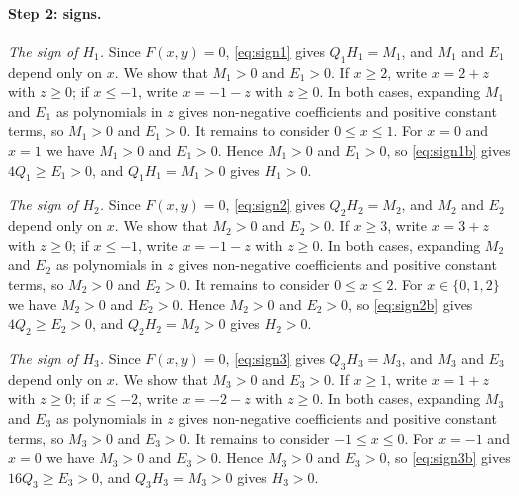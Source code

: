\documentclass[11pt]{article}
\begin{document}
\paragraph{Step 2: signs.} \emph{The sign of $H_{1}$.} Since $F(x,y)=0$, \eqref{eq:sign1} gives $Q_{1}H_{1}=M_{1}$, and $M_{1}$ and $E_{1}$ depend only on $x$. We show that $M_{1}>0$ and $E_{1}>0$. If $x\geq2$, write $x=2+z$ with $z\geq0$; if $x\leq-1$, write $x=-1-z$ with $z\geq0$. In both cases, expanding $M_{1}$ and $E_{1}$ as polynomials in $z$ gives non-negative coefficients and positive constant terms, so $M_{1}>0$ and $E_{1}>0$. It remains to consider $0\leq x\leq1$. For $x=0$ and $x=1$ we have $M_{1}>0$ and $E_{1}>0$. Hence $M_{1}>0$ and $E_{1}>0$, so \eqref{eq:sign1b} gives $4Q_{1}\geq E_{1}>0$, and $Q_{1}H_{1}=M_{1}>0$ gives $H_{1}>0$.

\emph{The sign of $H_{2}$.} Since $F(x,y)=0$, \eqref{eq:sign2} gives $Q_{2}H_{2}=M_{2}$, and $M_{2}$ and $E_{2}$ depend only on $x$. We show that $M_{2}>0$ and $E_{2}>0$. If $x\geq3$, write $x=3+z$ with $z\geq0$; if $x\leq-1$, write $x=-1-z$ with $z\geq0$. In both cases, expanding $M_{2}$ and $E_{2}$ as polynomials in $z$ gives non-negative coefficients and positive constant terms, so $M_{2}>0$ and $E_{2}>0$. It remains to consider $0\leq x\leq2$. For $x\in\{0,1,2\}$ we have $M_{2}>0$ and $E_{2}>0$. Hence $M_{2}>0$ and $E_{2}>0$, so \eqref{eq:sign2b} gives $4Q_{2}\geq E_{2}>0$, and $Q_{2}H_{2}=M_{2}>0$ gives $H_{2}>0$.

\emph{The sign of $H_{3}$.} Since $F(x,y)=0$, \eqref{eq:sign3} gives $Q_{3}H_{3}=M_{3}$, and $M_{3}$ and $E_{3}$ depend only on $x$. We show that $M_{3}>0$ and $E_{3}>0$. If $x\geq1$, write $x=1+z$ with $z\geq0$; if $x\leq-2$, write $x=-2-z$ with $z\geq0$. In both cases, expanding $M_{3}$ and $E_{3}$ as polynomials in $z$ gives non-negative coefficients and positive constant terms, so $M_{3}>0$ and $E_{3}>0$. It remains to consider $-1\leq x\leq0$. For $x=-1$ and $x=0$ we have $M_{3}>0$ and $E_{3}>0$. Hence $M_{3}>0$ and $E_{3}>0$, so \eqref{eq:sign3b} gives $16Q_{3}\geq E_{3}>0$, and $Q_{3}H_{3}=M_{3}>0$ gives $H_{3}>0$.
\end{document}
